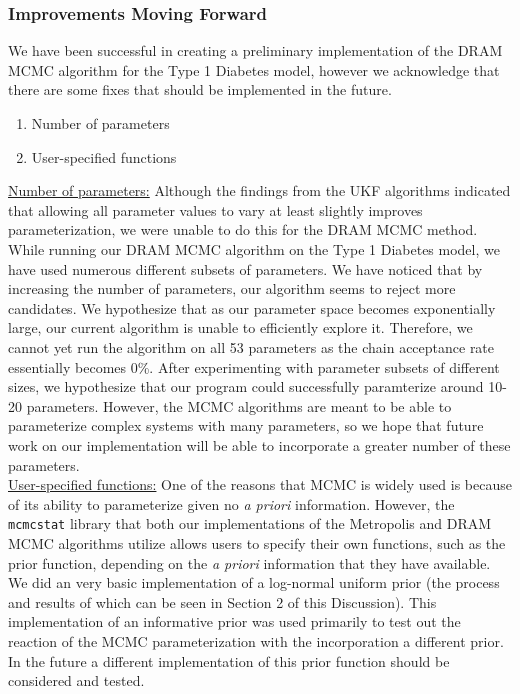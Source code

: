 \documentclass{article}
\begin{document}
\subsubsection{Improvements Moving Forward}
We have been successful in creating a preliminary implementation of the DRAM MCMC algorithm for the Type 1 Diabetes model, however we acknowledge that there are some fixes that should be implemented in the future.
\begin{enumerate}
    \item Number of parameters
    \item User-specified functions
\end{enumerate}
\vspace{3 mm}
\underline{Number of parameters:} Although the findings from the UKF algorithms indicated that allowing all parameter values to vary at least slightly improves parameterization, we were unable to do this for the DRAM MCMC method. While running our DRAM MCMC algorithm on the Type 1 Diabetes model, we have used numerous different subsets of parameters. We have noticed that by increasing the number of parameters, our algorithm seems to reject more candidates. We hypothesize that as our parameter space becomes exponentially large, our current algorithm is unable to efficiently explore it. Therefore, we cannot yet run the algorithm on all 53 parameters as the chain acceptance rate essentially becomes 0\%. After experimenting with parameter subsets of different sizes, we hypothesize that our program could successfully paramterize around 10-20 parameters. However, the MCMC algorithms are meant to be able to parameterize complex systems with many parameters, so we hope that future work on our implementation will be able to incorporate a greater number of these parameters.\vspace{3 mm}\\

\underline{User-specified functions:} One of the reasons that MCMC is widely used is because of its ability to parameterize given no \textit{a priori} information. However, the \texttt{mcmcstat} library that both our implementations of the Metropolis and DRAM MCMC algorithms utilize allows users to specify their own functions, such as the prior function, depending on the \textit{a priori} information that they have available. We did an very basic implementation of a log-normal uniform prior (the process and results of which can be seen in Section 2 of this Discussion). This implementation of an informative prior was used primarily to test out the reaction of the MCMC parameterization with the incorporation a different prior. In the future a different implementation of this prior function should be considered and tested. 
\end{document}
